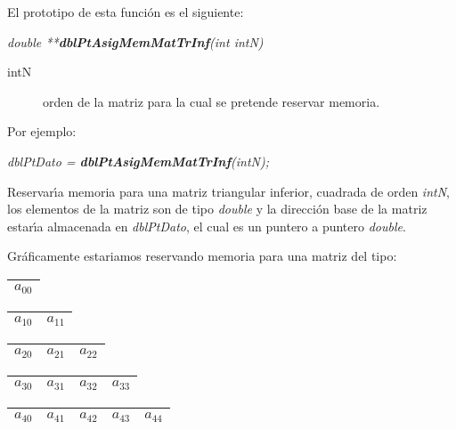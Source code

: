 El prototipo de esta funci\'on es el siguiente:

\begin{center}
\emph{double **\textbf{dblPtAsigMemMatTrInf}(int intN)}
\end{center}

\begin{description}
\item[intN] orden de la matriz para la cual se pretende reservar memoria.
\end{description}

Por ejemplo:

\begin{center}
\emph{dblPtDato = \textbf{dblPtAsigMemMatTrInf}(intN);}
\end{center}

Reservar\'{\i}a memoria para una matriz triangular inferior, cuadrada de 
orden \emph{intN}, los elementos de la matriz son de tipo \emph{double} y
la direcci\'on base de la matriz estar\'{\i}a almacenada en \emph{dblPtDato}, 
el cual es un puntero a puntero \emph{double}.\newline

Gr\'aficamente estariamos reservando memoria para una matriz del tipo:

\begin{flushleft}
	\begin{tabular}{|c|}
	\hline
	$a_{00}$ \\
	\hline
	\end{tabular}
\newline
	\begin{tabular}{|c|c|}
	\hline
	$a_{10}$ & $a_{11}$ \\
	\hline
	\end{tabular}
\newline
	\begin{tabular}{|c|c|c|}
	\hline
	$a_{20}$ & $a_{21}$ & $a_{22}$ \\
	\hline
	\end{tabular}
\newline	
	\begin{tabular}{|c|c|c|c|}
	\hline
	$a_{30}$ & $a_{31}$ & $a_{32}$ & $a_{33}$ \\
	\hline
	\end{tabular}
\newline
	\begin{tabular}{|c|c|c|c|c|}
	\hline
	$a_{40}$ & $a_{41}$ & $a_{42}$ & $a_{43}$ & $a_{44}$ \\
	\hline
	\end{tabular}
\end{flushleft}

